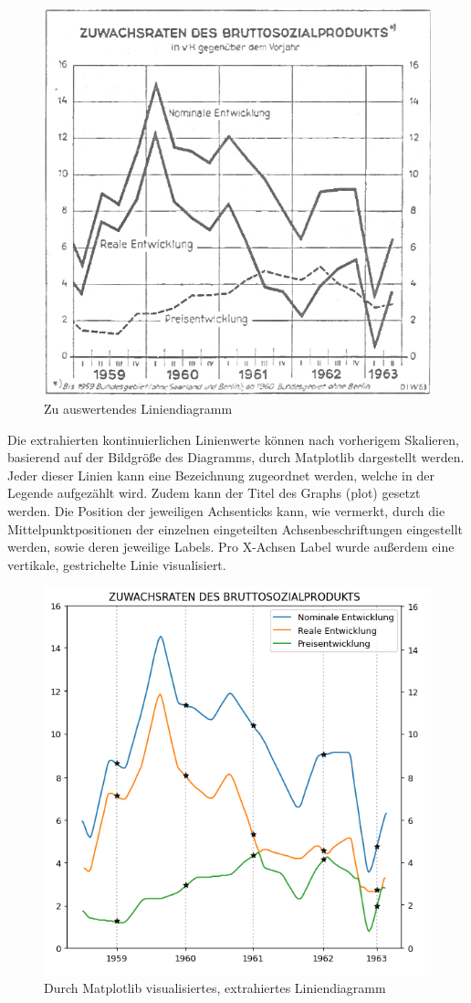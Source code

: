 \begin{figure}[H]
    \centering
    \captionsetup{width=.75\linewidth}
    \includegraphics[width=.75\textwidth]{Implementation/img/extraction_input2.png}
    \caption{ Zu auswertendes Liniendiagramm}
    \label{fig:extraction_input}
\end{figure}

Die extrahierten kontinuierlichen Linienwerte können nach vorherigem Skalieren, basierend auf der Bildgröße des Diagramms, durch Matplotlib dargestellt werden. Jeder dieser Linien kann eine Bezeichnung zugeordnet werden, welche in der Legende aufgezählt wird. Zudem kann der Titel des Graphs (plot) gesetzt werden. Die Position der jeweiligen Achsenticks kann, wie vermerkt, durch die Mittelpunktpositionen der einzelnen eingeteilten Achsenbeschriftungen eingestellt werden, sowie deren jeweilige Labels. Pro X-Achsen Label wurde außerdem eine vertikale, gestrichelte Linie visualisiert.

\begin{figure}[H]
    \centering
    \captionsetup{width=.75\linewidth}
    \includegraphics[width=.75\textwidth]{Implementation/img/extraction_output2.png}
    \caption{ Durch Matplotlib visualisiertes, extrahiertes Liniendiagramm}
    \label{fig:extraction_output}
\end{figure}

